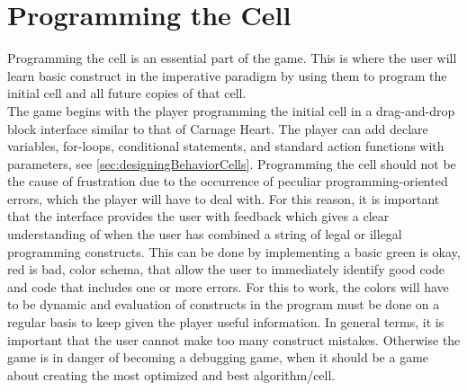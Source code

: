 \section{Programming the Cell}

Programming the cell is an essential part of the game. This is where the user will learn basic construct in the imperative paradigm by using them to program the initial cell and all future copies of that cell.\\

The game begins with the player programming the initial cell in a drag-and-drop block interface similar to that of Carnage Heart.
The player can add declare variables, for-loops, conditional statements, and standard action functions with parameters, see \autoref{sec:designingBehaviorCells}.
Programming the cell should not be the cause of frustration due to the occurrence of peculiar programming-oriented errors, which the player will have to deal with.
For this reason, it is important that the interface provides the user with feedback which gives a clear understanding of when the user has combined a string of legal or illegal programming constructs.
This can be done by implementing a basic green is okay, red is bad, color schema, that allow the user to immediately identify good code and code that includes one or more errors.
For this to work, the colors will have to be dynamic and evaluation of constructs in the program must be done on a regular basis to keep given the player useful information. 
In general terms, it is important that the user cannot make too many construct mistakes.
Otherwise the game is in danger of becoming a debugging game, when it should be a game about creating the most optimized and best algorithm/cell.





